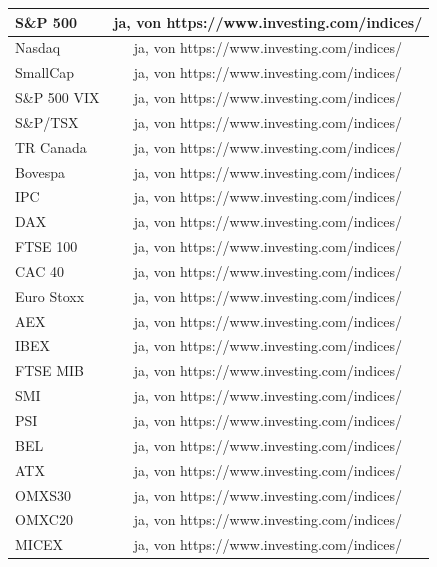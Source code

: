 \begin{longtable}[H]{|p{4cm}|p{}|p{}|}
S\&P 500	& \multicolumn{2}{c}{ja, von https://www.investing.com/indices/}\\ \hline
Nasdaq	 & \multicolumn{2}{c}{ja, von https://www.investing.com/indices/}\\ \hline
SmallCap & \multicolumn{2}{c}{ja, von https://www.investing.com/indices/}\\ \hline
S\&P 500 VIX& \multicolumn{2}{c}{ja, von https://www.investing.com/indices/}\\ \hline
S\&P/TSX	& \multicolumn{2}{c}{ja, von https://www.investing.com/indices/}\\ \hline
TR Canada  & \multicolumn{2}{c}{ja, von https://www.investing.com/indices/}\\ \hline
Bovespa	& \multicolumn{2}{c}{ja, von https://www.investing.com/indices/}\\ \hline
IPC & \multicolumn{2}{c}{ja, von https://www.investing.com/indices/}\\ \hline
DAX	& \multicolumn{2}{c}{ja, von https://www.investing.com/indices/}\\ \hline
FTSE 100		& \multicolumn{2}{c}{ja, von https://www.investing.com/indices/}\\ \hline
CAC 40	 	& \multicolumn{2}{c}{ja, von https://www.investing.com/indices/}\\ \hline
Euro Stoxx 	& \multicolumn{2}{c}{ja, von https://www.investing.com/indices/}\\ \hline
AEX		& \multicolumn{2}{c}{ja, von https://www.investing.com/indices/}\\ \hline
IBEX 	& \multicolumn{2}{c}{ja, von https://www.investing.com/indices/}\\ \hline
FTSE MIB	& \multicolumn{2}{c}{ja, von https://www.investing.com/indices/}\\ \hline	
SMI		& \multicolumn{2}{c}{ja, von https://www.investing.com/indices/}\\ \hline
PSI 	& \multicolumn{2}{c}{ja, von https://www.investing.com/indices/}\\ \hline
BEL 	& \multicolumn{2}{c}{ja, von https://www.investing.com/indices/}\\ \hline	 
ATX		& \multicolumn{2}{c}{ja, von https://www.investing.com/indices/}\\ \hline
OMXS30		& \multicolumn{2}{c}{ja, von https://www.investing.com/indices/}\\ \hline
OMXC20	& \multicolumn{2}{c}{ja, von https://www.investing.com/indices/}\\ \hline	
MICEX		& \multicolumn{2}{c}{ja, von https://www.investing.com/indices/}\\ \hline

\end{longtable}

